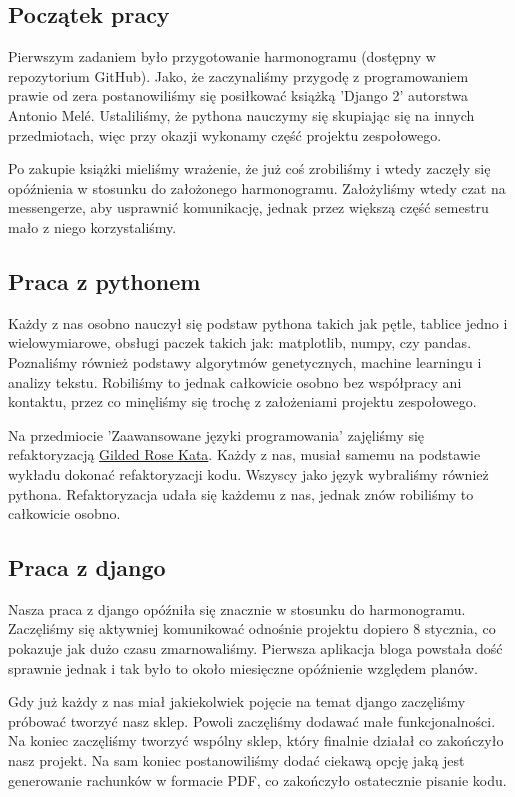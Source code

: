 \documentclass{article}
\begin{document}
\subsection{Początek pracy}
\parindent24pt Pierwszym zadaniem było przygotowanie harmonogramu (dostępny w repozytorium GitHub). Jako, że zaczynaliśmy przygodę z programowaniem prawie od zera postanowiliśmy się posiłkować książką 'Django 2' autorstwa Antonio Melé. Ustaliliśmy, że pythona nauczymy się skupiając się na innych przedmiotach, więc przy okazji wykonamy część projektu zespołowego. \par Po zakupie książki mieliśmy wrażenie, że już coś zrobiliśmy i wtedy zaczęły się opóźnienia w stosunku do założonego harmonogramu. Założyliśmy wtedy czat na messengerze, aby usprawnić komunikację, jednak przez większą część semestru mało z niego korzystaliśmy.
\subsection{Praca z pythonem}
\par Każdy z nas osobno nauczył się podstaw pythona takich jak pętle, tablice jedno i wielowymiarowe, obsługi paczek takich jak: matplotlib, numpy, czy pandas. Poznaliśmy również podstawy algorytmów genetycznych, machine learningu i analizy tekstu. Robiliśmy to jednak całkowicie osobno bez współpracy ani kontaktu, przez co minęliśmy się trochę z założeniami projektu zespołowego. \par Na przedmiocie 'Zaawansowane języki programowania' zajęliśmy się refaktoryzacją \href{https://github.com/emilybache/GildedRose-Refactoring-Kata}{Gilded Rose Kata}. Każdy z nas, musiał samemu na podstawie wykładu dokonać refaktoryzacji kodu. Wszyscy jako język wybraliśmy również pythona. Refaktoryzacja udała się każdemu z nas, jednak znów robiliśmy to całkowicie osobno.

\subsection{Praca z django}
\par Nasza praca z django opóźniła się znacznie w stosunku do harmonogramu. Zaczęliśmy się aktywniej komunikować odnośnie projektu dopiero 8 stycznia, co pokazuje jak dużo czasu zmarnowaliśmy. Pierwsza aplikacja bloga powstała dość sprawnie jednak i tak było to około miesięczne opóźnienie względem planów. \par Gdy już każdy z nas miał jakiekolwiek pojęcie na temat django zaczęliśmy próbować tworzyć nasz sklep. Powoli zaczęliśmy dodawać małe funkcjonalności. Na koniec zaczęliśmy tworzyć wspólny sklep, który finalnie działał co zakończyło nasz projekt. Na sam koniec postanowiliśmy dodać ciekawą opcję jaką jest generowanie rachunków w formacie PDF, co zakończyło ostatecznie pisanie kodu.
\end{document}
